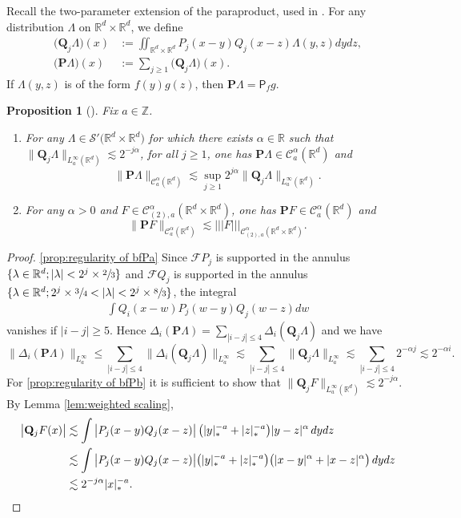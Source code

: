 \documentclass[11pt]{article}
\newcommand{\skpt}{\smallskip}
\numberwithin{equation}{section}
\newenvironment{enumeratea}
{\bgroup\def\theenumi{\alph{enumi}}\begin{enumerate}}
{\end{enumerate}\egroup}
\theoremstyle{plain}
\newtheorem{prop}[thm]{Proposition}
\theoremstyle{definition}
\newcommand{\trino}[1]{|\!|\!|#1|\!|\!|}
\newcommand{\bfP}{\mathbf{P}}
\newcommand{\bfQ}{\mathbf{Q}}
\newcommand{\sfP}{\mathsf{P}}
\newcommand{\bbR}{\mathbb{R}}
\newcommand{\bbZ}{\mathbb{Z}}
\newcommand{\mcC}{\mathcal{C}}
\newcommand\mcS{\mathcal{S}}
\begin{document}
Recall the two-parameter extension of the paraproduct, used in \cite{BH}. For any distribution $\Lambda$ on $\bbR^d\times \bbR^d$, we define
\begin{align*}
\bigl(\bfQ_j \Lambda\bigr)(x) &:= \iint_{\bbR^d\times\bbR^d} P_j(x-y)Q_j(x-z) \Lambda(y,z)dydz, \\
\bigl(\bfP \Lambda\bigr)(x) &:= \sum_{j\ge1} \bigl(\bfQ_j\Lambda\bigr)(x).
\end{align*}
If $\Lambda(y,z)$ is of the form $f(y)g(z)$, then $\bfP \Lambda=\sfP_fg$.

\begin{prop}[{\cite[Prop.\,8(a)]{BH}}]
\label{prop:regularity of bfP}
Fix $a\in\bbZ$.
\begin{enumeratea}
	\item\label{prop:regularity of bfPa} For any $\Lambda\in\mcS'\bigl(\bbR^d\times\bbR^d\bigr)$ for which there exists $\alpha\in\bbR$ such that $\big\|\bfQ_j\Lambda\big\|_{L_a^\infty(\bbR^d)}\lesssim2^{-j\alpha}$, for all $j\ge1$, one has $\bfP\Lambda\in \mcC_a^\alpha(\bbR^d)$ and
\[
\|\bfP\Lambda\|_{\mcC_a^\alpha(\bbR^d)} \lesssim\sup_{j\ge1}2^{j\alpha} \big\|\bfQ_j\Lambda\big\|_{L_a^\infty(\bbR^d)}.
\]
	\item\label{prop:regularity of bfPb} For any $\alpha>0$ and $F\in\mcC_{(2),a}^\alpha(\bbR^d\times\bbR^d)$, one has $\bfP F\in \mcC_a^\alpha(\bbR^d)$ and
\[
\|\bfP F\|_{\mcC_a^\alpha(\bbR^d)}\lesssim\trino{F}_{\mcC_{(2),a}^\alpha(\bbR^d\times\bbR^d)}.
\]
\end{enumeratea}
\end{prop}

\skpt
\begin{proof}
\eqref{prop:regularity of bfPa} Since $\mathscr{F} P_j$ is supported in the annulus $\{\lambda\in\bbR^d ; |\lambda|<2^j\times\sfrac23\}$ and $\mathscr{F} Q_j$ is supported in the annulus $\{\lambda\in\bbR^d ; 2^j\times\sfrac34 < |\lambda| < 2^j\times\sfrac83\}$, the integral
\begin{align*}
\int Q_i(x-w)P_j(w-y)Q_j(w-z)dw
\end{align*}
vanishes if $|i-j|\ge5$. Hence $\Delta_i({\bfP} \Lambda)=\sum_{|i-j|\le4}\Delta_i(\bfQ_j\Lambda)$ and we have
\[
\|\Delta_i({\bfP} \Lambda)\|_{L^\infty_a}
\le\sum_{|i-j|\le4}\|\Delta_i(\bfQ_j\Lambda)\|_{L^\infty_a}
\lesssim\sum_{|i-j|\le4}\|\bfQ_j\Lambda\|_{L^\infty_a}
\lesssim\sum_{|i-j|\le4}2^{-\alpha j}
\lesssim2^{-\alpha i}.
\]
For \eqref{prop:regularity of bfPb} it is sufficient to show that $\big\|\bfQ_jF\big\|_{L_a^\infty(\bbR^d)}\lesssim2^{-j\alpha}$. By Lemma \ref{lem:weighted scaling},
\begin{align*}
\big|\bfQ_jF(x)\big| &\lesssim \int \big|P_j(x-y)Q_j(x-z)\big| \,\bigl(|y|_*^{-a}+|z|_*^{-a}\bigr) |y-z|^\alpha\, dydz \\
&\lesssim \int \big|P_j(x-y)Q_j(x-z)\big| \bigl(|y|_*^{-a}+|z|_*^{-a}\bigr) \bigl(|x-y|^\alpha+|x-z|^\alpha\bigr) \,dydz \\
&\lesssim2^{-j\alpha}|x|_*^{-a}.\qedhere
\end{align*}
\end{proof}
\end{document}
